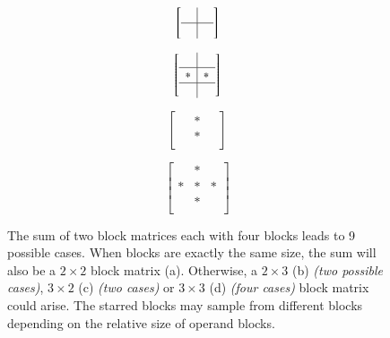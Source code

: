 \begin{figure}[ht] 
	\begin{subfigure}[b]{0.24\textwidth}
		\caption{}
		\begin{equation*}
			\left[ \begin{array}{c|c}
				\; & \; \\
				\hline
				& \\
			\end{array}\right]
		\end{equation*}
	\end{subfigure}
	\begin{subfigure}[b]{0.24\textwidth}
		\caption{}
		\begin{equation*}
			\left[ \begin{array}{c|c}
				\; & \; \\
				\hline
				* & * \\
				\hline
				& \\
			\end{array}\right]
		\end{equation*}
	\end{subfigure}
	\begin{subfigure}[b]{0.24\textwidth}
		\caption{}
		\begin{equation*}
			\left[ \begin{array}{c|c|c}
				\; & * & \;  \\
				\hline
				\; & * &\; \\
			\end{array}\right]
		\end{equation*}
	\end{subfigure}
	\begin{subfigure}[b]{0.24\textwidth}
		\caption{}
		\begin{equation*}
			\left[ \begin{array}{c|c|c}
				\; & * & \; \\
				\hline
				* & * & * \\
				\hline
				\; & * & \; \\
			\end{array}\right]
		\end{equation*}
	\end{subfigure}
	\caption[Possible block overlaps of $2 \times 2$ block matrices.] {
		The sum of two block matrices each with four blocks leads to 9 possible cases.
		When blocks are exactly the same size, the sum will also be a $2 \times 2$ block matrix (a).
		Otherwise, a $2 \times 3$ (b) \emph{(two possible cases)}, $3 \times 2$ (c) \emph{(two cases)} 
		or $3 \times 3$ (d) \emph{(four cases)} block matrix could arise.
		The starred blocks may sample from different blocks depending on the relative size of operand blocks.
	\label{MatAdditionPermutations}}
\end{figure}

